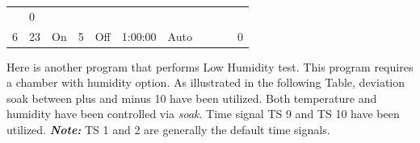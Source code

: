 \begin{longtable}[]{@{}lllllllllll@{}}
\begin{minipage}[t]{0.03\columnwidth}
\strut
\end{minipage} & \begin{minipage}[t]{0.03\columnwidth}\raggedright
0\strut
\end{minipage}\tabularnewline
\begin{minipage}[t]{0.09\columnwidth}\raggedright
6\strut
\end{minipage} & \begin{minipage}[t]{0.05\columnwidth}\raggedright
23\strut
\end{minipage} & \begin{minipage}[t]{0.09\columnwidth}\raggedright
On\strut
\end{minipage} & \begin{minipage}[t]{0.06\columnwidth}\raggedright
5\strut
\end{minipage} & \begin{minipage}[t]{0.06\columnwidth}\raggedright
Off\strut
\end{minipage} & \begin{minipage}[t]{0.12\columnwidth}\raggedright
1:00:00\strut
\end{minipage} & \begin{minipage}[t]{0.08\columnwidth}\raggedright
Auto\strut
\end{minipage} & \begin{minipage}[t]{0.04\columnwidth}\raggedright
\strut
\end{minipage} & \begin{minipage}[t]{0.05\columnwidth}\raggedright
\strut
\end{minipage} & \begin{minipage}[t]{0.03\columnwidth}\raggedright
\strut
\end{minipage} & \begin{minipage}[t]{0.03\columnwidth}\raggedright
0\strut
\end{minipage}\tabularnewline
\bottomrule
\end{longtable}

Here is another program that performs Low Humidity test. This program
requires a chamber with humidity option. As illustrated in the following
Table, deviation soak between plus and minus 10 have been utilized. Both
temperature and humidity have been controlled via \emph{soak}. Time
signal TS 9 and TS 10 have been utilized. \textbf{\emph{Note:}} TS 1 and
2 are generally the default time signals.

